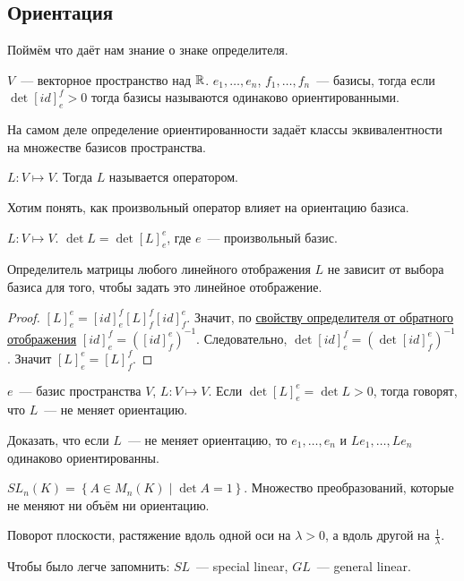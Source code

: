 \subsection{Ориентация}
\begin{motivation}
    Поймём что даёт нам знание о знаке определителя.
\end{motivation}
\begin{definition}
    $V$~--- векторное пространство над  $\mathbb{R}$. $e_1,\dots, e_n$, $f_1,\dots, f_n$~--- базисы,
    тогда если $\det[id]^f_e>0$ тогда базисы называются одинаково ориентированными.
\end{definition}
\begin{remark}
    На самом деле определение ориентированности задаёт классы эквивалентности на множестве
    базисов пространства.
\end{remark}
\begin{definition}
    $L\colon V\mapsto V$. Тогда $L$ называется оператором.
\end{definition}
\begin{motivation}
    Хотим понять, как произвольный оператор влияет на ориентацию базиса.
\end{motivation}
\begin{definition}
    \label{def:определитель отображения}
    $L\colon V\mapsto V$. $\det L = \det[L]^e_e$, где $e$~--- произвольный базис.
\end{definition}
\begin{remark}
    Определитель матрицы любого линейного отображения $L$ не зависит от выбора базиса для того, чтобы
    задать это линейное отображение.
\end{remark}
\begin{proof}
    $[L]^e_e = [id]^f_e [L]^f_f [id]^e_f$. Значит, по 
     \hyperref[thm:Свойства определителя]{свойству определителя от обратного отображения}
    $[id]^f_e = ([id]^e_f)^{-1}$. Следовательно, $\det [id]^f_e = (\det [id]^e_f)^{-1}$.
    Значит $[L]^e_e = [L]^f_f$.
\end{proof}
\begin{definition}
    $e$~--- базис пространства $V$, $L\colon V\mapsto V$. Если $\det [L]^e_e = \det L > 0$, тогда говорят, что $L$~--- не меняет ориентацию.
\end{definition}
\begin{task}
    Доказать, что если $L$~--- не меняет ориентацию, то $e_1,\dots, e_n$ и $Le_1,\dots, Le_n$ одинаково ориентированны.
\end{task}
\begin{definition}
    $SL_n(K) = \left\{A\in M_n(K)\mid \det A = 1 \right\}$. Множество преобразований, которые не меняют ни объём ни ориентацию.
\end{definition}
\begin{example}
    Поворот плоскости, растяжение вдоль одной оси на $\lambda > 0$, а вдоль другой на $\frac{1}{\lambda}$.
\end{example}
\begin{remark}
    Чтобы было легче запомнить: $SL$~--- special linear, $GL$~--- general linear.
\end{remark}
